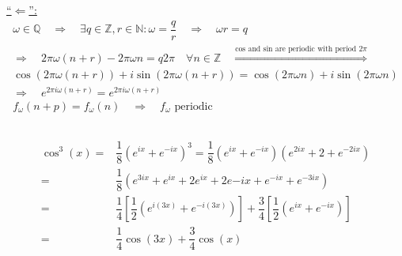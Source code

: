 \documentclass[11pt,a4paper]{scrartcl}
\begin{document}
\underline{"`$\Leftarrow$"':}
\begin{align}
\omega\in\mathbb{Q}\quad\Rightarrow\quad\exists q\in\mathbb{Z}, r\in\mathbb{N}: \omega = \dfrac{q}{r}\quad \Rightarrow\quad \omega r=q\\
\Rightarrow\quad 2\pi\omega(n+r)-2\pi\omega n = q2\pi\quad\forall n\in\mathbb{Z}\quad \overset{\text{cos and sin are periodic with period }2\pi}{\Rightarrow}\\ 
\cos(2\pi \omega (n+r)) + i\sin(2\pi \omega (n+r)) = \cos(2\pi \omega n) + i\sin(2\pi \omega n)\\
\Rightarrow \quad e^{2\pi i\omega (n+r)} = e^{2\pi i\omega (n+r)}\\
f_\omega(n+p)=f_\omega(n)\quad\Rightarrow\quad f_\omega \text{ periodic}
\end{align}

\subsection{}
\begin{align}
\cos^3(x)=&\dfrac{1}{8}(e^{ix}+e^{-ix})^3=\dfrac{1}{8}(e^{ix}+e^{-ix})(e^{2ix}+2+e^{-2ix})\\
=&\dfrac{1}{8}(e^{3ix}+e^{ix}+2e^{ix}+2e{-ix}+e^{-ix}+e^{-3ix})\\
=&\dfrac{1}{4}\left[\dfrac{1}{2}(e^{i(3x)}+e^{-i(3x)})\right]+\dfrac{3}{4}\left[\dfrac{1}{2}(e^{ix}+e^{-ix})\right]\\
=&\dfrac{1}{4}\cos(3x)+\dfrac{3}{4}\cos(x)
\end{align}
\end{document}
